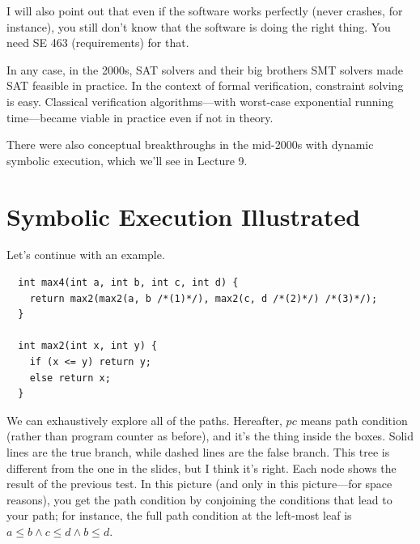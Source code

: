 \documentclass[11pt]{article}
\begin{document}
I will also point out that even if the software works perfectly (never crashes, for instance), you still don't know that the software is doing the right thing. You need SE 463 (requirements)
for that.

In any case, in the 2000s, SAT solvers and their big brothers SMT solvers made SAT feasible in practice. In the context of formal verification, constraint solving is easy. Classical verification
algorithms---with worst-case exponential running time---became viable in practice even if not in theory.

There were also conceptual breakthroughs in the mid-2000s with dynamic symbolic execution, which we'll see in Lecture 9.

\section*{Symbolic Execution Illustrated}
Let's continue with an example.
\begin{lstlisting}
  int max4(int a, int b, int c, int d) {
    return max2(max2(a, b /*(1)*/), max2(c, d /*(2)*/) /*(3)*/);
  }

  int max2(int x, int y) {
    if (x <= y) return y;
    else return x;
  }
\end{lstlisting}
We can exhaustively explore all of the paths. Hereafter, $\mathit{pc}$ means path condition (rather than program counter as before), and it's the thing inside the boxes. Solid lines are the true branch, while dashed lines are the false branch.
This tree is different from the one in the slides, but I think it's right. Each node shows the result of the previous test. In this picture (and only in this picture---for space reasons), you get
the path condition by conjoining the conditions that lead to your path; for instance, the full path condition at the left-most leaf is $a \le b \wedge c \le d \wedge b \le d$.
\end{document}
